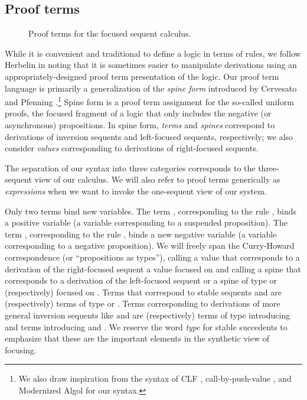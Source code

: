 \documentclass[acmtocl]{robtrans}\pdfoutput=1
\begin{document}
\subsection{Proof terms}\label{sec:proofterms}

\begin{figure}




\medskip
{}







\medskip
{}



\medskip
\fbox{}
\vspace{-12pt}

\caption{Proof terms for the focused sequent calculus.}
\label{fig:proofterms}
\end{figure}

While it is convenient and traditional to define a logic in terms of
rules, we follow Herbelin  in noting that it is 
sometimes 
easier to manipulate derivations using an appropriately-designed proof term
presentation of the logic. 
Our proof term language is primarily a
generalization of the {\it spine form} introduced by Cervesato and
Pfenning .\footnote{We also draw
  inspiration from the syntax of CLF \cite{watkins02concurrent},
  call-by-push-value \cite{levy04call}, and Modernized Algol
  \cite{harper12practical} for our syntax.}  Spine form is a proof
term assignment for the so-called uniform proofs, the focused fragment
of a logic that only includes the negative (or asynchronous)
propositions. In spine form, {\it terms} and {\it spines} correspond
to derivations of inversion sequents and left-focused sequents,
respectively; we also consider {\it values} corresponding to
derivations of right-focused sequents.

The separation of our syntax into three categories corresponds to the
three-sequent view of our calculus. We will also refer to proof terms
generically as {\it expressions}  when we want to invoke the
one-sequent view of our system.

Only two terms bind new variables. The term ,
corresponding to the rule , binds a positive variable  (a
variable corresponding to a suspended proposition). The term
, corresponding to the rule , binds a new
negative variable  (a variable corresponding to a negative
proposition).  We will freely span the Curry-Howard correspondence (or
``propositions as types''), calling a value that corresponds to a
derivation of the right-focused sequent  a value
focused on  and calling a spine that corresponds to a derivation
of the left-focused sequent  or
 a spine of type  or 
(respectively) focused on . Terms that correspond to stable
sequents  and
 are (respectively) terms of type
 or .  Terms corresponding to derivations of more general
inversion sequents like  and
 are (respectively) terms of type 
introducing  and terms introducing  and . We
reserve the word {\it type} for stable succedents to emphasize that
these are the important elements in the synthetic view of focusing.
\end{document}
